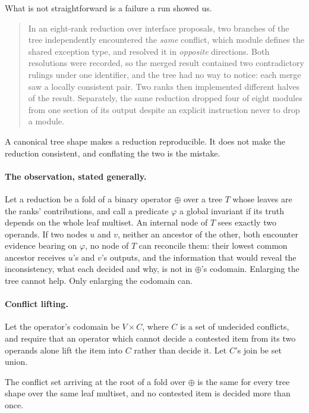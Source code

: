 \documentclass[sigconf,nonacm]{acmart}
\begin{document}
What is not straightforward is a failure a run showed us.

\begin{quote}
In an eight-rank reduction over interface proposals, two branches of the tree
independently encountered the \emph{same} conflict, which module defines the
shared exception type, and resolved it in \emph{opposite} directions. Both
resolutions were recorded, so the merged result contained two contradictory
rulings under one identifier, and the tree had no way to notice: each merge saw
a locally consistent pair. Two ranks then implemented different halves of the
result. Separately, the same reduction dropped four of eight modules from one
section of its output despite an explicit instruction never to drop a module.
\end{quote}

A canonical tree shape makes a reduction reproducible. It does not make the
reduction consistent, and conflating the two is the mistake.

\paragraph{The observation, stated generally.} Let a reduction be a fold of a
binary operator $\oplus$ over a tree $T$ whose leaves are the ranks'
contributions, and call a predicate $\varphi$ a global invariant if its truth
depends on the whole leaf multiset. An internal node of $T$ sees exactly two
operands. If two nodes $u$ and $v$, neither an ancestor of the other, both
encounter evidence bearing on $\varphi$, no node of $T$ can reconcile them: their
lowest common ancestor receives $u$'s and $v$'s outputs, and the information that
would reveal the inconsistency, what each decided and why, is not in $\oplus$'s
codomain. Enlarging the tree cannot help. Only enlarging the codomain can.

\paragraph{Conflict lifting.} Let the operator's codomain be $V \times C$,
where $C$ is a set of undecided conflicts, and require that an operator which
cannot decide a contested item from its two operands alone lift the item into $C$
rather than decide it. Let $C$'s join be set union.

\begin{proposition}
The conflict set arriving at the root of a fold over $\oplus$ is the same for
every tree shape over the same leaf multiset, and no contested item is decided
more than once.
\end{proposition}
\end{document}
